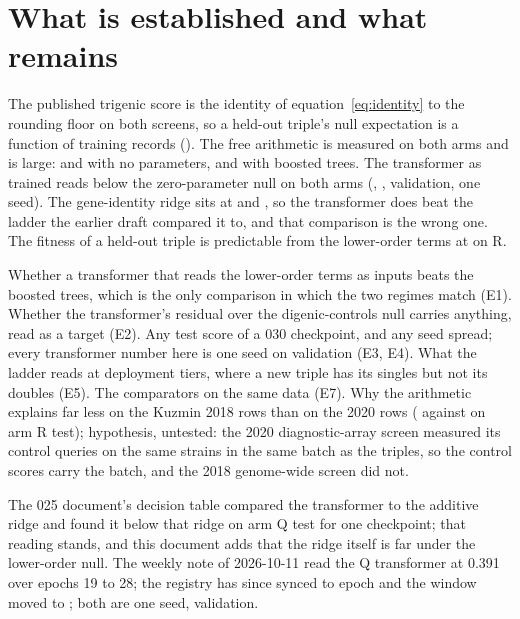 
\section{What is established and what remains}
\label{sec:remaining}

 The published trigenic score is the identity of
equation~\ref{eq:identity} to the rounding floor on both screens, so a held-out triple's
null expectation is a function of training records (). The free
arithmetic is measured on both arms and is large: \gloRNOnemultquerydoubletest{} and
\gloQNOnemultquerydoubletest{} with no parameters, \gloRLTwohgblowerordertest{} and
\gloQLTwohgblowerordertest{} with boosted trees. The transformer as trained reads below
the zero-parameter null on both arms (\gcgtRValWindow{}, \gcgtQValWindow{}, validation,
one seed). The gene-identity ridge sits at \gloRBOneadditivegenetest{} and
\gloQBOneadditivegenetest{}, so the transformer does beat the ladder the earlier draft
compared it to, and that comparison is the wrong one. The fitness of a held-out triple is
predictable from the lower-order terms at \gloRFOneridgelowerorderfitnesstest{} on R.

 Whether a transformer that reads the lower-order terms as inputs
beats the boosted trees, which is the only comparison in which the two regimes match
(E1). Whether the transformer's residual over the digenic-controls null carries
anything, read as a target (E2). Any test score of a 030 checkpoint, and any seed
spread; every transformer number here is one seed on validation (E3, E4). What the
ladder reads at deployment tiers, where a new triple has its singles but not its
doubles (E5). The comparators on the same data (E7). Why the arithmetic explains far
less on the Kuzmin 2018 rows than on the 2020 rows
(\gloRNOnemultquerydoubletestKzTwoZeroOneEight{} against
\gloRNOnemultquerydoubletestKzTwoZeroTwoZero{} on arm R test); hypothesis, untested:
the 2020 diagnostic-array screen measured its control queries on the same strains in the
same batch as the triples, so the control scores carry the batch, and the 2018
genome-wide screen did not.

 The 025 document's decision table compared the transformer
to the additive ridge and found it below that ridge on arm Q test for one checkpoint; that
reading stands, and this document adds that the ridge itself is far under the lower-order
null. The weekly note of 2026-10-11 read the Q transformer at 0.391 over epochs 19 to 28;
the registry has since synced to epoch \gcgtQLastEpoch{} and the window moved to
\gcgtQValWindow{}; both are one seed, validation.
